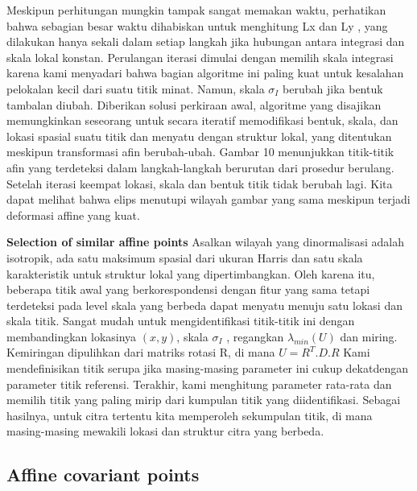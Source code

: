 Meskipun perhitungan mungkin tampak sangat memakan waktu, perhatikan bahwa sebagian besar waktu dihabiskan untuk menghitung Lx dan Ly , yang dilakukan hanya sekali dalam setiap langkah jika hubungan antara integrasi dan skala lokal konstan. Perulangan iterasi dimulai dengan memilih skala integrasi karena kami menyadari bahwa bagian algoritme ini paling kuat untuk kesalahan pelokalan kecil dari suatu titik minat. Namun, skala \(\sigma_{I}\) berubah jika bentuk tambalan diubah. Diberikan solusi perkiraan awal, algoritme yang disajikan memungkinkan seseorang untuk secara iteratif memodifikasi bentuk, skala, dan lokasi spasial suatu titik dan menyatu dengan struktur lokal, yang ditentukan meskipun transformasi afin berubah-ubah. Gambar 10 menunjukkan titik-titik afin yang terdeteksi dalam langkah-langkah berurutan dari prosedur berulang. Setelah iterasi keempat lokasi, skala dan bentuk titik tidak berubah lagi. Kita dapat melihat bahwa elips menutupi wilayah gambar yang sama meskipun terjadi deformasi affine yang kuat.

\textbf{Selection of similar affine points} Asalkan wilayah yang dinormalisasi adalah isotropik, ada satu maksimum spasial dari ukuran Harris dan satu skala karakteristik untuk struktur 
lokal yang dipertimbangkan. Oleh karena itu, beberapa titik awal yang berkorespondensi dengan fitur yang sama 
tetapi terdeteksi pada level skala yang berbeda dapat menyatu menuju satu lokasi dan skala titik. Sangat mudah untuk mengidentifikasi titik-titik ini dengan membandingkan 
lokasinya \((x,y)\), skala \(\sigma_{I}\) , regangkan \(\lambda_{min}(U)\) dan miring. Kemiringan dipulihkan dari matriks rotasi R, di mana \(U=R^{T}.D.R\) Kami mendefinisikan titik serupa jika masing-masing parameter ini cukup dekatdengan parameter titik referensi. Terakhir, kami menghitung parameter rata-rata dan memilih titik yang paling mirip dari kumpulan titik yang diidentifikasi. Sebagai hasilnya, untuk citra tertentu kita memperoleh sekumpulan titik, di mana masing-masing mewakili lokasi dan struktur citra yang berbeda.

\subsection{\textbf{Affine covariant points}}


